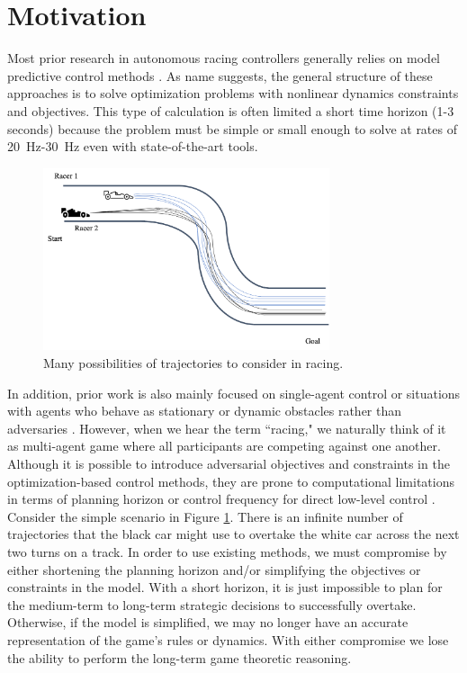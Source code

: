\section{Motivation} %
Most prior research in autonomous racing controllers generally relies on model predictive control methods \cite{Liniger2014, Anderson2016, Kalaria2021, Kloeser2020,OKelly2020, Vazquez2020}. As name suggests, the general structure of these approaches is to solve optimization problems with nonlinear dynamics constraints and objectives. This type of calculation is often limited a short time horizon (1-3 seconds) because the problem must be simple or small enough to solve at rates of \SI{20}{\hertz}-\SI{30}{\hertz} even with state-of-the-art tools. 

\begin{figure}
\begin{center}
   \includegraphics[width=0.75\textwidth]{Figures/MotivatingExampleInfTraj.png}
\caption{Many possibilities of trajectories to consider in racing.}
\label{fig:motivating_example:inf}
\end{center}
\end{figure}

In addition, prior work is also mainly focused on single-agent control or situations with agents who behave as stationary or dynamic obstacles rather than adversaries \cite{Liniger2014, Anderson2016, Kalaria2021, Kloeser2020,OKelly2020, Vazquez2020, He2021, Hou2016, Stahl2019_2}. However, when we hear the term ``racing," we naturally think of it as multi-agent game where all participants are competing against one another. Although it is possible to introduce adversarial objectives and constraints in the optimization-based control methods, they are prone to computational limitations in terms of planning horizon or control frequency for direct low-level control \cite{Liniger2020, Li2021}. Consider the simple scenario in Figure \ref{fig:motivating_example:inf}. There is an infinite number of trajectories that the black car might use to overtake the white car across the next two turns on a track. In order to use existing methods, we must compromise by either shortening the planning horizon and/or simplifying the objectives or constraints in the model. With a short horizon, it is just impossible to plan for the medium-term to long-term strategic decisions to successfully overtake. Otherwise, if the model is simplified, we may no longer have an accurate representation of the game's rules or dynamics. With either compromise we lose the ability to perform the long-term game theoretic reasoning.

